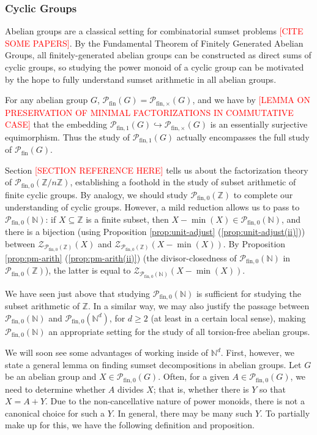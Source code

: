\documentclass{report}
\newcommand{\NN}{\mathbb{N}}
\renewcommand{\P}{\mathcal{P}}
\newcommand{\ZZ}{\mathbb{Z}}
\newcommand{\Z}{\mathcal{Z}}
\newcommand{\fin}{\textrm{fin}}
\newcommand{\funt}{{\textrm{fin}, \times}}
\newcommand{\fun}{{\textrm{fin}, 1}}
\newcommand{\fon}{{\textrm{fin}, 0}}
\renewcommand{\:}{\text{:}}
\newcommand{\PN}{{\P_{\fin,0}(\NN)}}
\theoremstyle{definition}
\begin{document}
\subsubsection*{Cyclic Groups}

Abelian groups are a classical setting for combinatorial sumset problems \textcolor{red}{[CITE SOME PAPERS]}.
By the Fundamental Theorem of Finitely Generated Abelian Groups, all finitely-generated abelian groups can be constructed as direct sums of cyclic groups, so studying the power monoid of a cyclic group can be motivated by the hope to fully understand sumset arithmetic in all abelian groups.

For any abelian group $G$, $\P_\fin(G)  = \P_\funt(G)$, and we have by \textcolor{red}{[LEMMA ON PRESERVATION OF MINIMAL FACTORIZATIONS IN COMMUTATIVE CASE]} that the embedding $\P_\fun(G) \hookrightarrow \P_\funt(G)$ is an essentially surjective equimorphism.
Thus the study of $\P_\fun(G)$ actually encompasses the full study of $\P_\fin(G)$. 

Section \textcolor{red}{[SECTION REFERENCE HERE]} tells us about the factorization theory of $\P_\fon(\ZZ/n\ZZ)$, establishing a foothold in the study of subset arithmetic of finite cyclic groups.  
By analogy, we should study $\P_\fon(\ZZ)$ to complete our understanding of cyclic groups.
However, a mild reduction allows us to pass to $\PN$: if $X \subseteq \ZZ$ is a finite subset, then $X-\min(X) \in \PN$, and there is a bijection (using Proposition \ref{prop:unit-adjust} (\ref{prop:unit-adjust(ii)})) between $\Z_{\P_\fon(\ZZ)}(X)$ and $\Z_{\P_\fon(\ZZ)}(X-\min(X))$.
By Proposition \ref{prop:pm-arith} (\ref{prop:pm-arith(ii)}) (the divisor-closedness of $\PN$ in $\P_\fon(\ZZ)$), the latter is equal to $\Z_{\PN}(X-\min(X))$.



We have seen just above that studying $\PN$ is sufficient for studying the subset arithmetic of $\ZZ$.
In a similar way, we may also justify the passage between $\PN$ and $\P_\fon(\NN^d)$, for $d\ge 2$ (at least in a certain local sense), making $\PN$ an appropriate setting for the study of all torsion-free abelian groups.

We will soon see some advantages of working inside of $\NN^d$.
First, however, we state a general lemma on finding sumset decompositions in abelian groups.
Let $G$ be an abelian group and $X\in \P_\fon(G)$.
Often, for a given $A\in \P_\fon(G)$, we need to determine whether $A$ divides $X$; that is, whether there is $Y$ so that $X = A+Y$.
Due to the non-cancellative nature of power monoids, there is not a canonical choice for such a $Y$.
In general, there may be many such $Y$.
To partially make up for this, we have the following definition and proposition.
\end{document}
